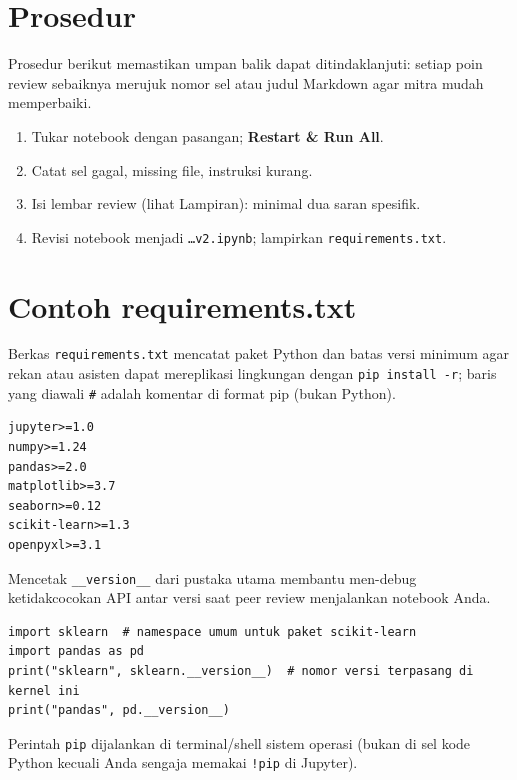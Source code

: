 \documentclass[../main.tex]{subfiles}
\begin{document}
\section{Prosedur}

Prosedur berikut memastikan umpan balik dapat ditindaklanjuti: setiap poin review sebaiknya merujuk nomor sel atau judul Markdown agar mitra mudah memperbaiki.

\begin{enumerate}[leftmargin=*]
  \item Tukar notebook dengan pasangan; \textbf{Restart \& Run All}.
  \item Catat sel gagal, missing file, instruksi kurang.
  \item Isi lembar review (lihat Lampiran): minimal dua saran spesifik.
  \item Revisi notebook menjadi \texttt{\ldots v2.ipynb}; lampirkan \texttt{requirements.txt}.
\end{enumerate}

\section{Contoh requirements.txt}

\MulaiPenjelasanKode Berkas \texttt{requirements.txt} mencatat paket Python dan batas versi minimum agar rekan atau asisten dapat mereplikasi lingkungan dengan \texttt{pip install -r}; baris yang diawali \texttt{\#} adalah komentar di format pip (bukan Python). \SelesaiPenjelasanKode

\begin{lstlisting}[caption={Contoh isi requirements.txt}, language={},basicstyle=\ttfamily\small]
jupyter>=1.0
numpy>=1.24
pandas>=2.0
matplotlib>=3.7
seaborn>=0.12
scikit-learn>=1.3
openpyxl>=3.1
\end{lstlisting}

\MulaiPenjelasanKode Mencetak \texttt{\_\_version\_\_} dari pustaka utama membantu men-debug ketidakcocokan API antar versi saat peer review menjalankan notebook Anda. \SelesaiPenjelasanKode

\begin{lstlisting}[caption=Cuplikan versi dari notebook]
import sklearn  # namespace umum untuk paket scikit-learn
import pandas as pd
print("sklearn", sklearn.__version__)  # nomor versi terpasang di kernel ini
print("pandas", pd.__version__)
\end{lstlisting}

\MulaiPenjelasanKode Perintah \texttt{pip} dijalankan di terminal/shell sistem operasi (bukan di sel kode Python kecuali Anda sengaja memakai \texttt{!pip} di Jupyter). \SelesaiPenjelasanKode
\end{document}
